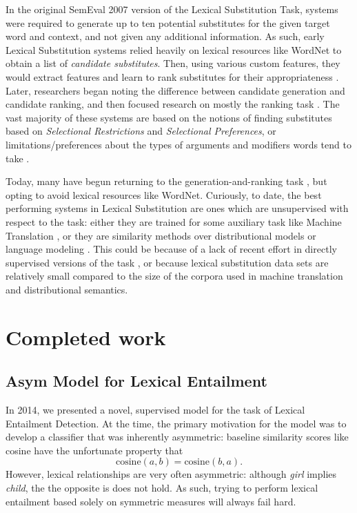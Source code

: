\documentclass[letterpaper]{article}
\begin{document}
In the original SemEval 2007 version of the Lexical Substitution Task, systems
were required to generate up to ten potential substitutes for the given target
word and context, and not given any additional information. As such, early
Lexical Substitution systems relied heavily on lexical resources like WordNet
to obtain a list of {\em candidate substitutes}. Then, using various custom
features, they would extract features and learn to rank substitutes for their
appropriateness \cite{mccarthy:2007:semeval}. Later, researchers began noting
the difference between candidate generation and candidate ranking, and then
focused research on mostly the ranking task \cite{NEEDCITE}. The vast majority
of these systems are based on the notions of finding substitutes based on {\em
Selectional Restrictions} and {\em Selectional Preferences}, or
limitations/preferences about the types of arguments and modifiers words tend
to take \cite{NEEDCITE}.

Today, many have begun returning to the generation-and-ranking task
\cite{kawakami:2015:arxiv,melamud:2015:naacl,roller:2016:naacl}, but opting to
avoid lexical resources like WordNet.  Curiously, to date, the best performing
systems in Lexical Substitution are ones which are unsupervised with respect to
the task: either they are trained for some auxiliary task like Machine
Translation \cite{kawakami:2015:arxiv}, or they are similarity methods over
distributional models \cite{roller:2016:naacl} or language modeling
\cite{melamud:2015:naacl}. This could be because of a lack of recent effort in
directly supervised versions of the task \cite{szarvas:2013:naacl}, or because
lexical substitution data sets are relatively small compared to the size of the
corpora used in machine translation and distributional semantics.

\section{Completed work}

\subsection{Asym Model for Lexical Entailment \cite{roller:2014:coling}}
\label{sec:asym}

In 2014, we presented a novel, supervised model for the task of Lexical
Entailment Detection. At the time, the primary
motivation for the model was to develop a classifier that was inherently
asymmetric: baseline similarity scores like cosine have the unfortunate
property that
\begin{equation*}
  \text{cosine}(a, b) = \text{cosine}(b, a).
\end{equation*}
However, lexical relationships are very often asymmetric: although {\em girl}
implies {\em child}, the the opposite is does not hold. As such, trying to
perform lexical entailment based solely on symmetric measures will always
fail hard.
\end{document}
